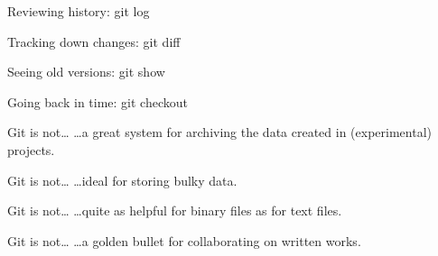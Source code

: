 \begin{frame}[fragile]{Reviewing history: git log}
\end{frame}

\begin{frame}[fragile]{Tracking down changes: git diff}
\end{frame}

\begin{frame}[fragile]{Seeing old versions: git show}
\end{frame}

\begin{frame}[fragile]{Going back in time: git checkout}
\end{frame}

\begin{frame}{Git is not\ldots}
  \hangindent=30pt \Huge {
  \ldots a great system for archiving the data created in (experimental) projects.
  }
\end{frame}

\begin{frame}{Git is not\ldots}
  \hangindent=30pt \Huge {
  \ldots ideal for storing bulky data.
  }
\end{frame}

\begin{frame}{Git is not\ldots}
  \hangindent=30pt \Huge {
  \ldots quite as helpful for binary files as for text files.
  }
\end{frame}

\begin{frame}{Git is not\ldots}
  \hangindent=30pt \Huge {
  \ldots a golden bullet for collaborating on written works.
  }
\end{frame}



